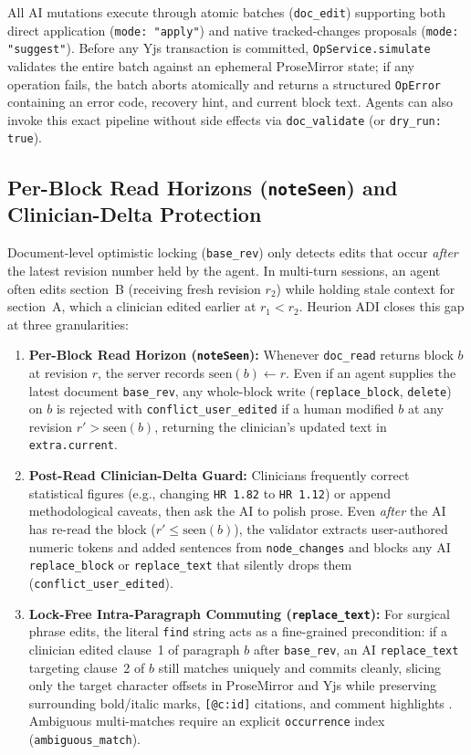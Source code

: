 \documentclass[11pt,a4paper]{article}
\begin{document}
All AI mutations execute through atomic batches (\texttt{doc\_edit}) supporting both direct application (\texttt{mode: "apply"}) and native tracked-changes proposals (\texttt{mode: "suggest"}). Before any Yjs transaction is committed, \texttt{OpService.simulate} validates the entire batch against an ephemeral ProseMirror state; if any operation fails, the batch aborts atomically and returns a structured \texttt{OpError} containing an error code, recovery hint, and current block text. Agents can also invoke this exact pipeline without side effects via \texttt{doc\_validate} (or \texttt{dry\_run: true}).

\subsection{Per-Block Read Horizons (\texttt{noteSeen}) and Clinician-Delta Protection}
Document-level optimistic locking (\texttt{base\_rev}) only detects edits that occur \emph{after} the latest revision number held by the agent. In multi-turn sessions, an agent often edits section~B (receiving fresh revision $r_2$) while holding stale context for section~A, which a clinician edited earlier at $r_1 < r_2$. Heurion ADI closes this gap at three granularities:
\begin{enumerate}[leftmargin=1.5em,itemsep=2pt]
  \item \textbf{Per-Block Read Horizon (\texttt{noteSeen}):} Whenever \texttt{doc\_read} returns block $b$ at revision $r$, the server records $\text{seen}(b) \leftarrow r$. Even if an agent supplies the latest document \texttt{base\_rev}, any whole-block write (\texttt{replace\_block}, \texttt{delete}) on $b$ is rejected with \texttt{conflict\_user\_edited} if a human modified $b$ at any revision $r' > \text{seen}(b)$, returning the clinician's updated text in \texttt{extra.current}.
  \item \textbf{Post-Read Clinician-Delta Guard:} Clinicians frequently correct statistical figures (e.g., changing \texttt{HR 1.82} to \texttt{HR 1.12}) or append methodological caveats, then ask the AI to polish prose. Even \emph{after} the AI has re-read the block ($r' \le \text{seen}(b)$), the validator extracts user-authored numeric tokens and added sentences from \texttt{node\_changes} and blocks any AI \texttt{replace\_block} or \texttt{replace\_text} that silently drops them (\texttt{conflict\_user\_edited}).
  \item \textbf{Lock-Free Intra-Paragraph Commuting (\texttt{replace\_text}):} For surgical phrase edits, the literal \texttt{find} string acts as a fine-grained precondition: if a clinician edited clause~1 of paragraph $b$ after \texttt{base\_rev}, an AI \texttt{replace\_text} targeting clause~2 of $b$ still matches uniquely and commits cleanly, slicing only the target character offsets in ProseMirror and Yjs while preserving surrounding bold/italic marks, \texttt{[@c:id]} citations, and comment highlights \cite{litt2022peritext}. Ambiguous multi-matches require an explicit \texttt{occurrence} index (\texttt{ambiguous\_match}).
\end{enumerate}
\end{document}
